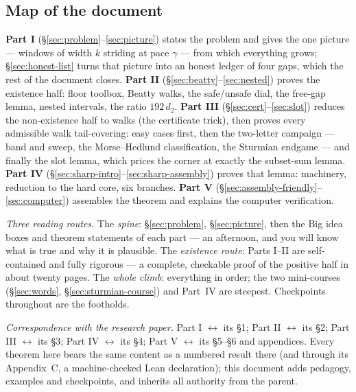 \documentclass[11pt,reqno]{amsart}
\theoremstyle{plain}
\theoremstyle{definition}
\theoremstyle{remark}
\begin{document}
\subsection{Map of the document}\label{sec:map-friendly}

\textbf{Part I} (\S\ref{sec:problem}--\ref{sec:picture}) states the problem and
gives the one picture --- windows of width $k$ striding at pace $\gamma$ --- from
which everything grows; \S\ref{sec:honest-list} turns that picture into an honest
ledger of four gaps, which the rest of the document closes. \textbf{Part II}
(\S\ref{sec:beatty}--\ref{sec:nested}) proves the existence half: floor toolbox,
Beatty walks, the safe/unsafe dial, the free-gap lemma, nested intervals, the
ratio $192\,d_2$. \textbf{Part III} (\S\ref{sec:cert}--\ref{sec:slot}) reduces
the non-existence half to walks (the certificate trick), then proves every
admissible walk tail-covering: easy cases first, then the two-letter campaign ---
band and sweep, the Morse--Hedlund classification, the Sturmian endgame --- and
finally the slot lemma, which prices the corner at exactly the subset-sum lemma.
\textbf{Part IV} (\S\ref{sec:sharp-intro}--\ref{sec:sharp-assembly}) proves that
lemma: machinery, reduction to the hard core, six branches. \textbf{Part V}
(\S\ref{sec:assembly-friendly}--\ref{sec:computer}) assembles the theorem and
explains the computer verification.

\emph{Three reading routes.} The \emph{spine}: \S\ref{sec:problem},
\S\ref{sec:picture}, then the Big idea boxes and theorem statements of each
part --- an afternoon, and you will know what is true and why it is plausible.
The \emph{existence route}: Parts I--II are self-contained and fully rigorous
--- a complete, checkable proof of the positive half in about twenty pages. The
\emph{whole climb}: everything in order; the two mini-courses
(\S\ref{sec:words}, \S\ref{sec:sturmian-course}) and Part~IV are steepest.
Checkpoints throughout are the footholds.

\emph{Correspondence with the research paper.} Part I $\leftrightarrow$ its
\S1; Part II $\leftrightarrow$ its \S2; Part III $\leftrightarrow$ its \S3;
Part IV $\leftrightarrow$ its \S4; Part V $\leftrightarrow$ its \S5--\S6 and
appendices. Every theorem here bears the same content as a numbered result
there (and through its Appendix~C, a machine-checked Lean declaration); this
document adds pedagogy, examples and checkpoints, and inherits all
authority from the parent.

\end{document}
